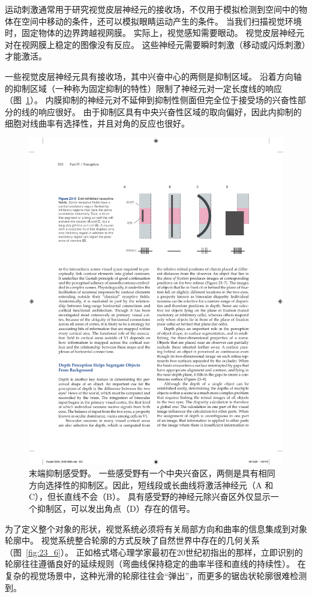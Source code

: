 运动刺激通常用于研究视觉皮层神经元的接收场，不仅用于模拟检测到空间中的物体在空间中移动的条件，还可以模拟眼睛运动产生的条件。
当我们扫描视觉环境时，固定物体的边界跨越视网膜。
实际上，视觉感知需要眼动。
视觉皮层神经元对在视网膜上稳定的图像没有反应。
这些神经元需要瞬时刺激（移动或闪烁刺激）才能激活。


一些视觉皮层神经元具有接收场，其中兴奋中心的两侧是抑制区域。
沿着方向轴的抑制区域（一种称为固定抑制的特性）限制了神经元对一定长度线的响应（图~\ref{fig:23_5}）。
内膜抑制的神经元对不延伸到抑制性侧面但完全位于接受场的兴奋性部分的线的响应很好。
由于抑制区具有中央兴奋性区域的取向偏好，因此内抑制的细胞对线曲率有选择性，并且对角的反应也很好。


\begin{figure}[htbp]
	\centering
	\includegraphics[width=0.8\linewidth]{chap23/fig_23_5}
	\caption{末端抑制感受野。
		一些感受野有一个中央兴奋区，两侧是具有相同方向选择性的抑制区。因此，短线段或长曲线将激活神经元（A 和 C），但长直线不会（B）。
		具有感受野的神经元除兴奋区外仅显示一个抑制区，可以发出角点（D）存在的信号。}
	\label{fig:23_5}
\end{figure}


为了定义整个对象的形状，视觉系统必须将有关局部方向和曲率的信息集成到对象轮廓中。
视觉系统整合轮廓的方式反映了自然世界中存在的几何关系（图~\ref{fig:23_6}）。
正如格式塔心理学家最初在20世纪初指出的那样，立即识别的轮廓往往遵循良好的延续规则（弯曲线保持稳定的曲率半径和直线的持续性）。
在复杂的视觉场景中，这种光滑的轮廓往往会“弹出”，而更多的锯齿状轮廓很难检测到。


